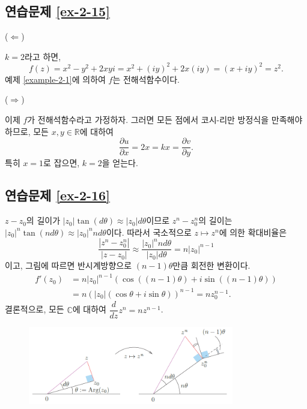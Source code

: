 \subsection*{연습문제 \ref{ex-2-15}}

($\Leftarrow$)

$k=2$라고 하면,
\[
f(z) = x^2-y^2 + 2xyi = x^2 + (iy)^2 + 2x(iy) = (x+iy)^2 = z^2.
\]
예제 \ref{example-2-1}에 의하여 $f$는 전해석함수이다.

\noindent($\Rightarrow$)

이제 $f$가 전해석함수라고  가정하자.
그러면 모든 점에서 코시-리만 방정식을 만족해야 하므로, 모든 $x, y\in \mathbb R$에 대하여
\[
\dfrac{\partial u}{\partial x} = 2x = kx = \dfrac{\partial v}{\partial y}.
\]
특히 $x=1$로 잡으면, $k=2$을 얻는다.

\subsection*{연습문제 \ref{ex-2-16}}

$z-z_0$의 길이가 $|z_0|\tan(d\theta) \approx |z_0| d\theta$이므로
$z^n-z_0^n$의 길이는 $|z_0|^n\tan(nd\theta) \approx |z_0|^nnd\theta$이다.
따라서 국소적으로 $z\mapsto z^n$에 의한 확대비율은
\[
 \dfrac{|z^n-z_0^n|}{|z-z_0|} \approx \dfrac{|z_0|^n nd\theta}{|z_0|d\theta}
 = n|z_0|^{n-1}
\]
이고, 그림에 따르면 반시계방향으로 $(n-1)\theta$만큼 회전한 변환이다.
\begin{align*}
f'(z_0) &= n|z_0|^{n-1} ( \cos((n-1)\theta) + i\sin((n-1)\theta) ) \\
&= n(|z_0|(\cos\theta + i\sin\theta))^{n-1} = nz_0^{n-1}.
\end{align*}
결론적으로, 모든 $\mathbb C$에 대하여 $\dfrac d{dz} z^n = nz^{n-1}$.

\begin{figure}[h!]
\begin{center}
\includegraphics[width=0.8\textwidth]{./Solution/figs/fig-s-0-6}
\end{center}
\end{figure}

